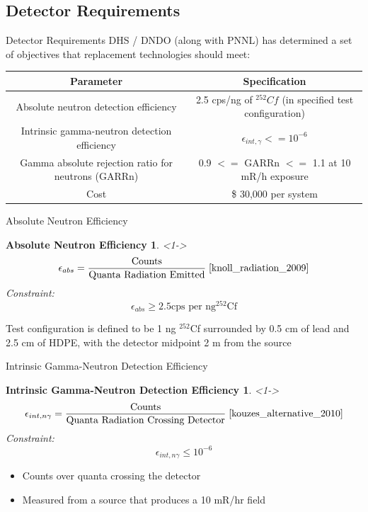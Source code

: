 \subsection{Detector Requirements}
\begin{frame}{Detector Requirements}
DHS / DNDO (along with PNNL) has determined a set of objectives that replacement technologies should meet:
\begin{table}\footnotesize
	\tiny
	\begin{tabular}{c c }
	Parameter & Specification \\
	\hline
	\hline
	Absolute neutron detection efficiency & 2.5 cps/ng of ${}^{252}Cf$ (in specified test configuration) \\
	Intrinsic gamma-neutron detection efficiency & $ \epsilon_{int,\gamma} <= 10^{-6}$ \\
	Gamma absolute rejection ratio for neutrons (GARRn) &  0.9 $<=$ GARRn $<=$ 1.1 at 10 mR/h exposure \\
	Cost &  \$ 30,000 per system \\
	\hline
	\end{tabular}
\end{table}
\end{frame}

\begin{frame}{Absolute Neutron Efficiency}
\newtheorem{thm1}{Absolute Neutron Efficiency}
\begin{thm1}<1->
$$\epsilon_{abs} = \frac{\text{Counts}}{\text{Quanta Radiation Emitted}} \; \protect \cite{knoll_radiation_2009} $$
Constraint:
$$\epsilon_{abs} \geq 2.5 \text{cps per ng} {}^{252}\text{Cf}$$
\end{thm1}
Test configuration is defined to be 1 ng ${}^{252}$Cf surrounded by 0.5 cm of lead and 2.5 cm of HDPE, with the detector midpoint 2 m from the source \cite{kouzes_alternative_2010}
\end{frame}


\begin{frame}{Intrinsic Gamma-Neutron Detection Efficiency}
\newtheorem{thm2}{Intrinsic Gamma-Neutron Detection Efficiency}
\begin{thm2}<1->
$$\epsilon_{int,n \gamma} = \frac{\text{Counts}}{\text{Quanta Radiation Crossing Detector}} \; \protect \cite{kouzes_alternative_2010} $$
Constraint:
$$ \epsilon_{int,n \gamma} \leq 10^{-6} $$
\end{thm2}
\begin{itemize}
	\item Counts over quanta crossing the detector
	\item Measured from a source that produces a 10 mR/hr field
\end{itemize}
\end{frame}

